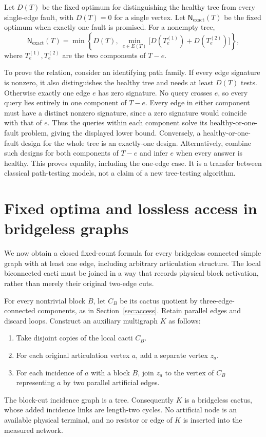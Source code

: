 \documentclass[11pt,letterpaper]{article}
\newcommand{\N}{\mathsf N}
\begin{document}
Let $D(T)$ be the fixed optimum for distinguishing the healthy tree from every single-edge fault, with $D(T)=0$ for a single vertex. Let $\N_{\mathrm{exact}}(T)$ be the fixed optimum when exactly one fault is promised. For a nonempty tree,
\[
 \N_{\mathrm{exact}}(T)=
 \min\left\{D(T),\ \min_{e\in E(T)}
       \bigl[D(T_e^{(1)})+D(T_e^{(2)})\bigr]\right\},
\]
where $T_e^{(1)},T_e^{(2)}$ are the two components of $T-e$.

To prove the relation, consider an identifying path family. If every edge signature is nonzero, it also distinguishes the healthy tree and needs at least $D(T)$ tests. Otherwise exactly one edge $e$ has zero signature. No query crosses $e$, so every query lies entirely in one component of $T-e$. Every edge in either component must have a distinct nonzero signature, since a zero signature would coincide with that of $e$. Thus the queries within each component solve its healthy-or-one-fault problem, giving the displayed lower bound. Conversely, a healthy-or-one-fault design for the whole tree is an exactly-one design. Alternatively, combine such designs for both components of $T-e$ and infer $e$ when every answer is healthy. This proves equality, including the one-edge case. It is a transfer between classical path-testing models, not a claim of a new tree-testing algorithm.

\section{Fixed optima and lossless access in bridgeless graphs}\label{sec:connectedaccess}
We now obtain a closed fixed-count formula for every bridgeless connected simple graph with at least one edge, including arbitrary articulation structure. The local biconnected cacti must be joined in a way that records physical block activation, rather than merely their original two-edge cuts.

For every nontrivial block $B$, let $C_B$ be its cactus quotient by three-edge-connected components, as in Section~\ref{sec:access}. Retain parallel edges and discard loops. Construct an auxiliary multigraph $K$ as follows:
\begin{enumerate}
\item Take disjoint copies of the local cacti $C_B$.
\item For each original articulation vertex $a$, add a separate vertex $z_a$.
\item For each incidence of $a$ with a block $B$, join $z_a$ to the vertex of $C_B$ representing $a$ by two parallel artificial edges.
\end{enumerate}
The block-cut incidence graph is a tree. Consequently $K$ is a bridgeless cactus, whose added incidence links are length-two cycles. No artificial node is an available physical terminal, and no resistor or edge of $K$ is inserted into the measured network.
\end{document}
